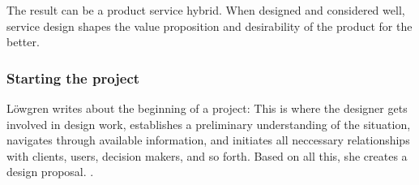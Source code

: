 The result can be a product service hybrid. When designed and considered well, service design shapes the value proposition and desirability of the product for the better.

\subsubsection{Starting the project}

Löwgren writes about the beginning of a project: This is where the designer gets involved in design work, establishes a preliminary understanding of the situation, navigates through available information, and initiates all neccessary relationships with clients, users, decision makers, and so forth. Based on all this, she creates a design proposal. \cite{lowgren}.

